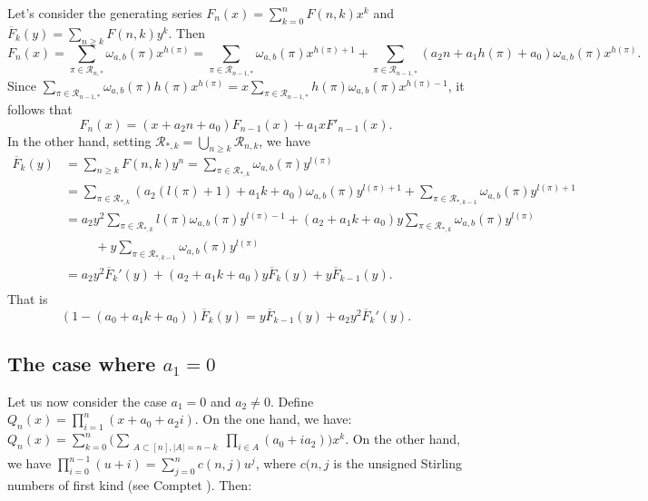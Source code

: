 \documentclass[12pt,a4paper]{article}
\theoremstyle{definition} %
\theoremstyle{remark}
\theoremstyle{examples}
\begin{document}
\noindent Let's consider the generating series $F_n(x)=\sum_{k=0}^nF(n,k)x^k$ and $\overline{F}_k(y)=\sum_{n\geq k}F(n,k)y^k.$
Then $$\displaystyle F_n(x)=\sum_{\pi\in\mathcal{R}_{n,*}}\omega_{a,b}(\pi)x^{h(\pi)}=\sum_{\pi\in\mathcal{R}_{n-1,*}}\omega_{a,b}(\pi)x^{h(\pi)+1}+\sum_{\pi\in\mathcal{R}_{n-1,*}}(a_2n+a_1h(\pi)+a_0)\omega_{a,b}(\pi)x^{h(\pi)}.$$ %
Since $\sum_{\pi\in\mathcal{R}_{n-1,*}}\omega_{a,b}(\pi)h(\pi)x^{h(\pi)}=x\sum_{\pi\in\mathcal{R}_{n-1,*}}h(\pi)\omega_{a,b}(\pi)x^{h(\pi)-1}$, it follows that
\begin{equation}
F_n(x)=(x+a_2n+a_0)F_{n-1}(x)+a_1xF'_{n-1}(x).
\end{equation}
In the other hand, setting $\displaystyle\mathcal{R}_{*,k}=\bigcup_{n\geq k}\mathcal{R}_{n,k}$, we have
\begin{align*}
\overline{F}_k(y)&=\sum_{n\geq k}F(n,k)y^n= \sum_{\pi\in\mathcal{R}_{*,k}}\omega_{a,b}(\pi)y^{l(\pi)}\\&=\sum_{\pi\in\mathcal{R}_{*,k}}(a_2(l(\pi)+1)+a_1k+a_0)\omega_{a,b}(\pi)y^{l(\pi)+1}+\sum_{\pi\in\mathcal{R}_{*,k-1}}\omega_{a,b}(\pi)y^{l(\pi)+1}\\
&=a_2y^2\sum_{\pi\in\mathcal{R}_{*,k}}l(\pi)\omega_{a,b}(\pi)y^{l(\pi)-1}+(a_2+a_1k+a_0)y\sum_{\pi\in\mathcal{R}_{*,k}}\omega_{a,b}(\pi)y^{l(\pi)}\\
& \hspace{1cm} +y\sum_{\pi\in\mathcal{R}_{*,k-1}}\omega_{a,b}(\pi)y^{l(\pi)}\\
&=a_2y^2\overline{F}_k'(y)+(a_2+a_1k+a_0)y\overline{F}_k(y)+y\overline{F}_{k-1}(y).\\
\end{align*}
That is
\begin{equation}
(1-(a_0+a_1k+a_0))\overline{F}_k(y)=y\overline{F}_{k-1}(y)+a_2y^2\overline{F}_k'(y).
\end{equation}

\subsection{The case where $a_1= 0$}
Let us now consider the case $a_1=0$ and $a_2\neq 0$. Define $Q_n(x)=\prod_{i=1}^{n}(x+a_0+a_2i)$.
On the one hand,  we have: $Q_n(x)=\displaystyle\sum_{k=0}^n\big(\sum_{ \displaystyle\substack{A\subset [n], |A|=n-k}}\prod_{i\in A}(a_0+ia_2)\big)x^k$.
On the other hand, we have $\prod_{i=0}^{n-1}(u+i)=\sum_{j=0}^nc(n,j)u^j$, where $c(n,j$ is the unsigned Stirling numbers of first kind (see Comptet \cite{comtet}). Then:
\end{document}

